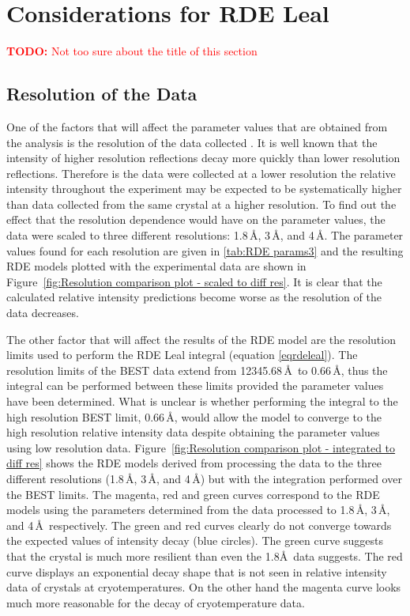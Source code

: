 \section{Considerations for RDE Leal}
\label{sec:Considerations for RDE Leal}
\textcolor{red}{
    \begin{myenumerate}
        \item \hypertarget{todo:new title?}{\textbf{TODO:} Not too sure about the title of this section}
    \end{myenumerate}
}
\subsection{Resolution of the Data}
\label{sub:Resolution of the Data}
One of the factors that will affect the parameter values that are obtained from the analysis is the resolution of the data collected \cite{leal2012}.
It is well known that the intensity of higher resolution reflections decay more quickly than lower resolution reflections.
Therefore is the data were collected at a lower resolution the relative intensity throughout the experiment may be expected to be systematically higher than data collected from the same crystal at a higher resolution.
To find out the effect that the resolution dependence would have on the parameter values, the data were scaled to three different resolutions: 1.8\,\AA, 3\,\AA, and 4\,\AA.
The parameter values found for each resolution are given in \ref{tab:RDE params3} and the resulting RDE models plotted with the experimental data are shown in Figure~\ref{fig:Resolution comparison plot - scaled to diff res}.
It is clear that the calculated relative intensity predictions become worse as the resolution of the data decreases.

The other factor that will affect the results of the RDE model are the resolution limits used to perform the RDE Leal integral (equation \ref{eqrdeleal}).
The resolution limits of the BEST data extend from 12345.68\,\AA\ to 0.66\,\AA, thus the integral can be performed between these limits provided the parameter values have been determined.
What is unclear is whether performing the integral to the high resolution BEST limit, 0.66\,\AA, would allow the model to converge to the high resolution relative intensity data despite obtaining the parameter values using low resolution data.
Figure~\ref{fig:Resolution comparison plot - integrated to diff res} shows the RDE models derived from processing the data to the three different resolutions (1.8\,\AA, 3\,\AA, and 4\,\AA) but with the integration performed over the BEST limits.
The magenta, red and green curves correspond to the RDE models using the parameters determined from the data processed to 1.8\,\AA, 3\,\AA, and 4\,\AA\ respectively.
The green and red curves clearly do not converge towards the expected values of intensity decay (blue circles).
The green curve suggests that the crystal is much more resilient than even the 1.8\AA\ data suggests.
The red curve displays an exponential decay shape that is not seen in relative intensity data of crystals at cryotemperatures.
On the other hand the magenta curve looks much more reasonable for the decay of cryotemperature data.

